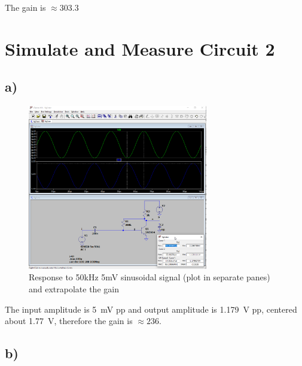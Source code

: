 \documentclass{article}
\begin{document}
	The gain is $\approx 303.3$

	
	
	
	
	\section{Simulate and Measure Circuit 2}
	
	\subsection*{a)}

	\begin{figure}[H]
	    \centering
	    \includegraphics[width=0.7\textwidth]{2a}
	    \caption{Response to 50kHz 5mV sinusoidal signal (plot in separate panes) and extrapolate the gain}
	\end{figure}
	
	The input amplitude is \SI{5}{\mV} pp and output amplitude is \SI{1.179}{\volt} pp, centered about \SI{1.77}{\volt}, therefore the gain is $\approx 236$.
	
	\subsection*{b)}
\end{document}

